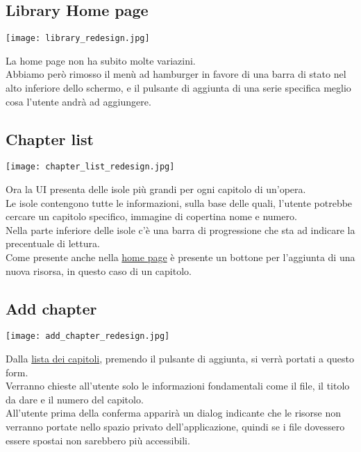 \documentclass[../Assignment-3-LPSMT.tex]{subfiles}
\begin{document}
\subsection{Library Home page}\label{sec:home_redesign}

\begin{center}
   \texttt{[image: library\_redesign.jpg]}
\end{center}

La home page non ha subito molte variazini.\\
Abbiamo però rimosso il menù ad hamburger in favore di una barra di stato nel alto inferiore dello schermo, e il pulsante di aggiunta di una serie specifica meglio cosa l'utente andrà ad aggiungere.

\subsection{Chapter list}\label{sec:ch_list_redesign}

\begin{center}
   \texttt{[image: chapter\_list\_redesign.jpg]}
\end{center}

Ora la UI presenta delle isole più grandi per ogni capitolo di un'opera.\\
Le isole contengono tutte le informazioni, sulla base delle quali, l'utente potrebbe cercare un capitolo specifico, immagine di copertina nome e numero.\\
Nella parte inferiore delle isole c'è una barra di progressione che sta ad indicare la precentuale di lettura.\\
Come presente anche nella \hyperref[sec:home_redesign]{home page} è presente un bottone per l'aggiunta di una nuova risorsa, in questo caso di un capitolo.

\subsection{Add chapter}

\begin{center}
   \texttt{[image: add\_chapter\_redesign.jpg]}
\end{center}

Dalla \hyperref[sec:ch_list_redesign]{lista dei capitoli}, premendo il pulsante di aggiunta, si verrà portati a questo form.\\
Verranno chieste all'utente solo le informazioni fondamentali come il file, il titolo da dare e il numero del capitolo.\\
All'utente prima della conferma apparirà un dialog indicante che le risorse non verranno portate nello spazio privato dell'applicazione, quindi se i file dovessero essere spostai non sarebbero più accessibili.
\end{document}

